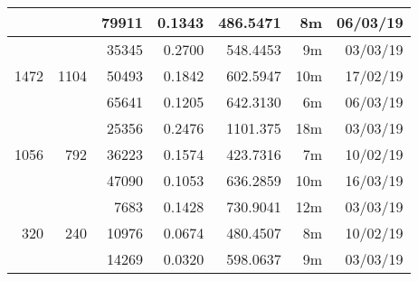 \begin{center}
\begin{tabular}{ r r r | r | r r r }
  & & 79911 & 0.1343 & 486.5471 & 8m & 06/03/19 \\
  \hline
  \multirow{3}{*}{1472} & \multirow{3}{*}{1104} & 35345 & 0.2700 & 548.4453 & 9m & 03/03/19 \\
  & & 50493 & 0.1842 & 602.5947 & 10m & 17/02/19 \\
  & & 65641 & 0.1205 & 642.3130 & 6m & 06/03/19 \\
  \hline
  \multirow{3}{*}{1056} & \multirow{3}{*}{792} & 25356 & 0.2476 & 1101.375 & 18m & 03/03/19 \\
  & & 36223 & 0.1574 & 423.7316 & 7m & 10/02/19 \\
  & & 47090 & 0.1053 & 636.2859 & 10m & 16/03/19 \\
  \hline
  \multirow{3}{*}{320} & \multirow{3}{*}{240} & 7683 & 0.1428 & 730.9041 & 12m & 03/03/19 \\
  & & 10976 & 0.0674 & 480.4507 & 8m & 10/02/19 \\
  & & 14269 & 0.0320 & 598.0637 & 9m & 03/03/19 \\
  \end{tabular}
  \end{center}